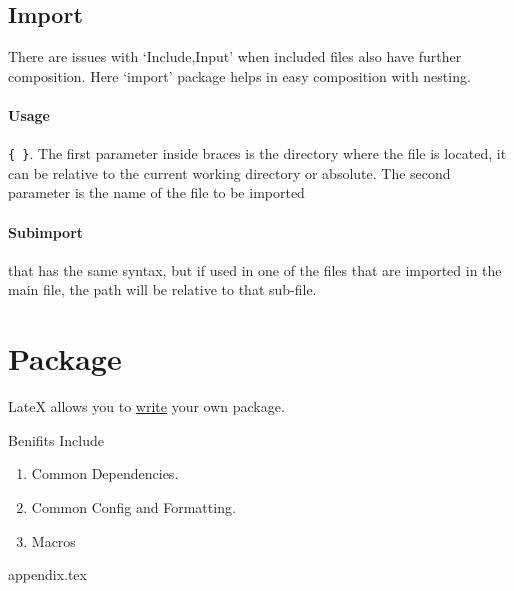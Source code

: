 \documentclass{report}[a4paper,12pt] %
\begin{document}
\subsection{Import}
There are issues with `Include,Input' when included files also have further composition. Here `import' package helps in easy composition with nesting. 

\paragraph{Usage} \verb|{ }|. The first parameter inside braces is the directory where the file is located, it can be relative to the current working directory or absolute. The second parameter is the name of the file to be imported

\paragraph{Subimport} \verb|| that has the same syntax, but if used in one of the files that are imported in the main file, the path will be relative to that sub-file.

\section{Package}
LateX allows you to \href{https://www.overleaf.com/learn/latex/Writing_your_own_package}{write} your own package.

Benifits Include
\begin{enumerate}
  \item Common Dependencies.
  \item Common Config and Formatting.
  \item Macros
\end{enumerate}

{appendix.tex}
\end{document}
